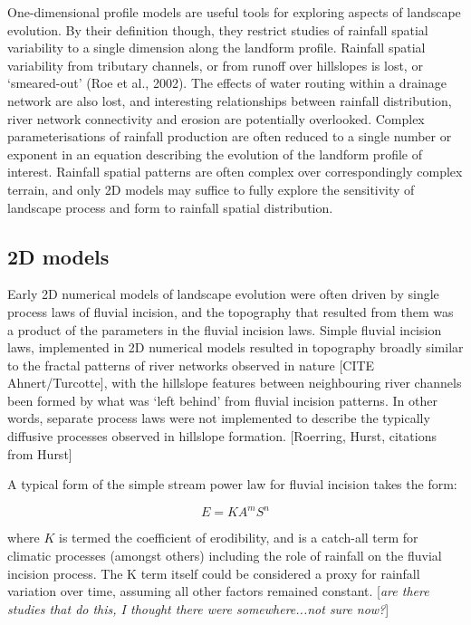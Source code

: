 \documentclass[12pt,oneside,PhD]{muthesis}
\begin{document}
One-dimensional profile models are useful tools for exploring aspects of landscape evolution. By their definition though, they restrict studies of rainfall spatial variability to a single dimension along the landform profile. Rainfall spatial variability from tributary channels, or from runoff over hillslopes is lost, or `smeared-out' (Roe et al., 2002). The effects of water routing within a drainage network are also lost, and interesting relationships between rainfall distribution, river network connectivity and erosion are potentially overlooked. Complex parameterisations of rainfall production are often reduced to a single number or exponent in an equation describing the evolution of the landform profile of interest. Rainfall spatial patterns are often complex over correspondingly complex terrain, and only 2D models may suffice to fully explore the sensitivity of landscape process and form to rainfall spatial distribution.

\subsection{2D models}
Early 2D numerical models of landscape evolution were often driven by single process laws of fluvial incision, and the topography that resulted from them was a product of the parameters in the fluvial incision laws. Simple fluvial incision laws, implemented in 2D numerical models resulted in topography broadly similar to the fractal patterns of river networks observed in nature [CITE Ahnert/Turcotte], with the hillslope features between neighbouring river channels been formed by what was `left behind' from fluvial incision patterns. In other words, separate process laws were not implemented to describe the typically diffusive processes observed in hillslope formation. [Roerring, Hurst, citations from Hurst]

A typical form of the simple stream power law for fluvial incision takes the form:

\begin{equation}
E = KA^mS^n
\end{equation}

where \(K\) is termed the coefficient of erodibility, and is a catch-all term for climatic processes (amongst others) including the role of rainfall on the fluvial incision process. The K term itself could be considered a proxy for rainfall variation over time, assuming all other factors remained constant. [\textit{are there studies that do this, I thought there were somewhere...not sure now?}]
\end{document}
